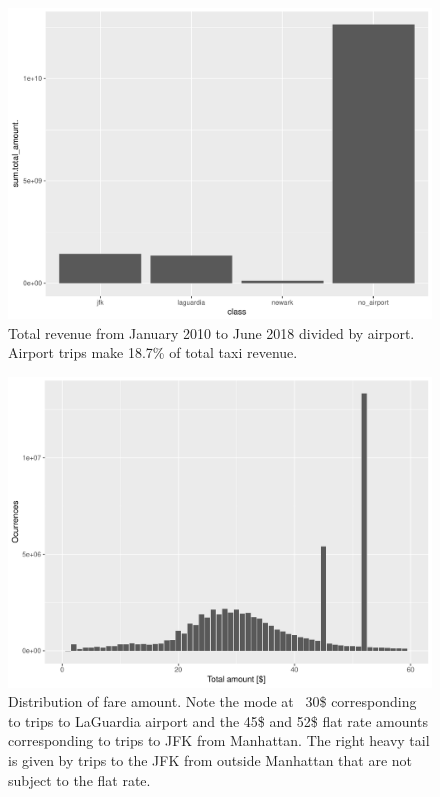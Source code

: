\documentclass{acm_proc_article-sp-sigmod09}
\begin{document}
\begin{figure}
	\centering
	\includegraphics[width=1\columnwidth]{resources/airport/total_amount_by_airport.pdf}
	\caption{Total revenue from January 2010 to June 2018 divided by airport. Airport trips make 18.7\% of total taxi revenue.}
	\label{fig:airportProfitDistr}
\end{figure}

\begin{figure}
	\centering
	\includegraphics[width=1\columnwidth]{resources/airport/fare_amount_distr.pdf}
	\caption{Distribution of fare amount. Note the mode at ~30\$ corresponding to trips to LaGuardia airport and the 45\$ and 52\$ flat rate amounts corresponding to trips to JFK from Manhattan. The right heavy tail is given by trips to the JFK from outside Manhattan that are not subject to the flat rate.}
	\label{fig:airportFareAmount}
\end{figure}
\end{document}
